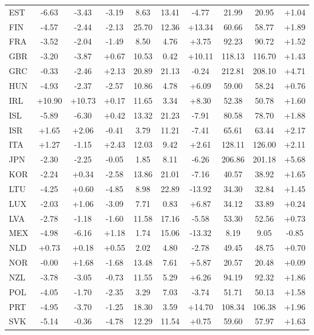 \documentclass[12pt, a4paper]{article}
\begin{document}
\begin{longtable}{lccccccccc}
EST & -6.63 & -3.43 & -3.19 & 8.63 & 13.41 & -4.77 & 21.99 & 20.95 & +1.04 \\
FIN & -4.57 & -2.44 & -2.13 & 25.70 & 12.36 & +13.34 & 60.66 & 58.77 & +1.89 \\
FRA & -3.52 & -2.04 & -1.49 & 8.50 & 4.76 & +3.75 & 92.23 & 90.72 & +1.52 \\
GBR & -3.20 & -3.87 & +0.67 & 10.53 & 0.42 & +10.11 & 118.13 & 116.70 & +1.43 \\
GRC & -0.33 & -2.46 & +2.13 & 20.89 & 21.13 & -0.24 & 212.81 & 208.10 & +4.71 \\
HUN & -4.93 & -2.37 & -2.57 & 10.86 & 4.78 & +6.09 & 59.00 & 58.24 & +0.76 \\
IRL & +10.90 & +10.73 & +0.17 & 11.65 & 3.34 & +8.30 & 52.38 & 50.78 & +1.60 \\
ISL & -5.89 & -6.30 & +0.42 & 13.32 & 21.23 & -7.91 & 80.58 & 78.70 & +1.88 \\
ISR & +1.65 & +2.06 & -0.41 & 3.79 & 11.21 & -7.41 & 65.61 & 63.44 & +2.17 \\
ITA & +1.27 & -1.15 & +2.43 & 12.03 & 9.42 & +2.61 & 128.11 & 126.00 & +2.11 \\
JPN & -2.30 & -2.25 & -0.05 & 1.85 & 8.11 & -6.26 & 206.86 & 201.18 & +5.68 \\
KOR & -2.24 & +0.34 & -2.58 & 13.86 & 21.01 & -7.16 & 40.57 & 38.92 & +1.65 \\
LTU & -4.25 & +0.60 & -4.85 & 8.98 & 22.89 & -13.92 & 34.30 & 32.84 & +1.45 \\
LUX & -2.03 & +1.06 & -3.09 & 7.71 & 0.83 & +6.87 & 34.12 & 33.89 & +0.24 \\
LVA & -2.78 & -1.18 & -1.60 & 11.58 & 17.16 & -5.58 & 53.30 & 52.56 & +0.73 \\
MEX & -4.98 & -6.16 & +1.18 & 1.74 & 15.06 & -13.32 & 8.19 & 9.05 & -0.85 \\
NLD & +0.73 & +0.18 & +0.55 & 2.02 & 4.80 & -2.78 & 49.45 & 48.75 & +0.70 \\
NOR & -0.00 & +1.68 & -1.68 & 13.48 & 7.61 & +5.87 & 20.57 & 20.48 & +0.09 \\
NZL & -3.78 & -3.05 & -0.73 & 11.55 & 5.29 & +6.26 & 94.19 & 92.32 & +1.86 \\
POL & -4.05 & -1.70 & -2.35 & 3.29 & 7.03 & -3.74 & 51.71 & 50.13 & +1.58 \\
PRT & -4.95 & -3.70 & -1.25 & 18.30 & 3.59 & +14.70 & 108.34 & 106.38 & +1.96 \\
SVK & -5.14 & -0.36 & -4.78 & 12.29 & 11.54 & +0.75 & 59.60 & 57.97 & +1.63 \\

\end{longtable}
\end{document}
